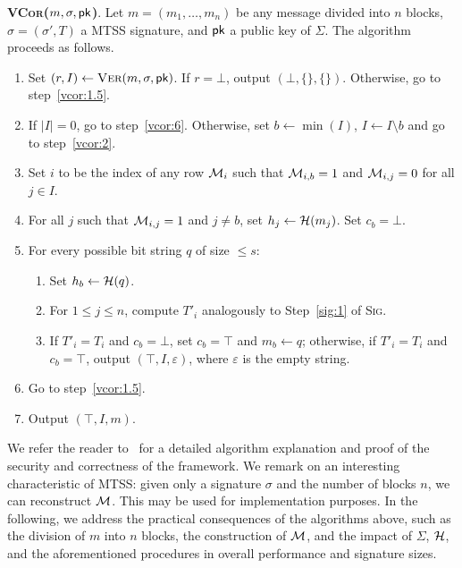 \documentclass[12pt]{article}
\begin{document}
\noindent \textbf{\textsc{VCor}($m, \sigma, \mathsf{pk}$)}. 
Let $m = (m_{1}, \dots, m_{n})$ be any message divided into $n$ blocks, $\sigma = (\sigma', T)$ a MTSS signature, and $\mathsf{pk}$ a public key of $\Sigma$. The algorithm proceeds as follows.
\begin{enumerate}
  \item\label{vcor:1} Set $(r, I) \leftarrow \textsc{Ver}(m, \sigma, \mathsf{pk})$. If $r = \bot$, output $(\bot, \{\}, \{\})$. Otherwise, go to step~\ref{vcor:1.5}.
  \item\label{vcor:1.5} If $|I| = 0$, go to step~\ref{vcor:6}. Otherwise, set $b \leftarrow \min(I)$, $I \leftarrow I \setminus b$ and go to step~\ref{vcor:2}.
  \item\label{vcor:2} Set $i$ to be the index of any row $\mathcal{M}_{i}$ such that $\mathcal{M}_{i,b} = 1$ and $\mathcal{M}_{i,j} = 0$ for all $j \in I$.
  \item\label{vcor:3} For all $j$ such that $\mathcal{M}_{i,j} = 1$ and $j \neq b$, set $h_{j} \leftarrow \mathcal{H}(m_{j})$. Set $c_{b} = \bot$.
  \item\label{vcor:4} For every possible bit string $q$ of size $\leq s$:
    \begin{enumerate}
      \item Set $h_b \leftarrow \mathcal{H}(q)$.
      \item For $1 \leq j \leq n$, compute $T'_{i}$ analogously to Step~\ref{sig:1} of \textsc{Sig}.
      \item If $T'_{i} = T_{i}$ and $c_{b} = \bot$, set $c_{b} = \top$ and $m_{b} \leftarrow q$; otherwise, if $T'_{i} = T_{i}$ and $c_{b} = \top$, output $(\top, I, \varepsilon)$, where $\varepsilon$ is the empty string.
    \end{enumerate}
  \item\label{vcor:5} Go to step~\ref{vcor:1.5}.
  \item\label{vcor:6} Output $(\top, I, m)$.
\end{enumerate}

We refer the reader to~\cite{mtss-idalino-2019} for a detailed algorithm explanation and proof of the security and correctness of the framework. We remark on an interesting characteristic of MTSS: given only a signature $\sigma$ and the number of blocks $n$, we can reconstruct $\mathcal{M}$. This may be used for implementation purposes. In the following, we address the practical consequences of the algorithms above, such as the division of $m$ into $n$ blocks, the construction of $\mathcal{M}$, and the impact of $\Sigma$, $\mathcal{H}$, and the aforementioned procedures in overall performance and signature sizes.
\end{document}
